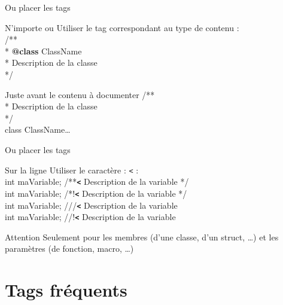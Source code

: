 \documentclass{beamer}
\begin{document}
\begin{frame}{Ou placer les tags}
\begin{block}{N'importe ou}
Utiliser le tag correspondant au type de contenu :\\
/**\\
 * \textcolor{dgreen}{\textbf{@class}} ClassName\\
 * Description de la classe\\
 */\\
\end{block}

\begin{block}{Juste avant le contenu à documenter}
/**\\
 * Description de la classe\\
 */\\
 class ClassName\dots
\end{block}

\end{frame}

\begin{frame}{Ou placer les tags}
\begin{block}{Sur la ligne}
Utiliser le caractère : \textcolor{dgreen}{\verb?<?} :\\
int maVariable; /**\textcolor{dgreen}{\textbf{\verb?<?}} Description de la variable */\\
int maVariable; /*!\textcolor{dgreen}{\textbf{\verb?<?}} Description de la variable */\\
int maVariable; ///\textcolor{dgreen}{\textbf{\verb?<?}} Description de la variable \\
int maVariable; //!\textcolor{dgreen}{\textbf{\verb?<?}} Description de la variable \\
\end{block}

\begin{alertblock}{Attention}
Seulement pour les membres (d'une classe, d'un struct, \dots) et les paramètres (de fonction, macro, \dots)
\end{alertblock}

\end{frame}


\section{Tags fréquents}
\subsection{}
\end{document}
